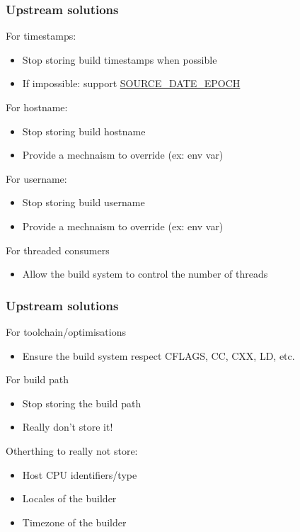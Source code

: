 \begin{frame}
	\frametitle{Upstream solutions}
	For timestamps:
	\begin{itemize}
		\item Stop storing build timestamps when possible
			\pause
		\item If impossible: support \href{https://reproducible-builds.org/specs/source-date-epoch/}{SOURCE\_DATE\_EPOCH}
	\end{itemize}
	\pause
	For hostname:
	\begin{itemize}
		\item Stop storing build hostname
		\pause
		\item Provide a mechnaism to override (ex: env var)
	\end{itemize}
	\pause
	For username:
	\begin{itemize}
		\item Stop storing build username
			\pause
		\item Provide a mechnaism to override (ex: env var)
	\end{itemize}
	\pause
	For threaded consumers
	\begin{itemize}
		\item Allow the build system to control the number of threads
	\end{itemize}
\end{frame}

\begin{frame}
	\frametitle{Upstream solutions}
	For toolchain/optimisations
	\begin{itemize}
		\item Ensure the build system respect CFLAGS, CC, CXX, LD, etc.
	\end{itemize}
	\pause
	For build path
	\begin{itemize}
		\item Stop storing the build path
			\pause
		\item Really don't store it!
	\end{itemize}
	\pause
	Otherthing to really not store:
	\begin{itemize}
		\item Host CPU identifiers/type
			\pause
		\item Locales of the builder
			\pause
		\item Timezone of the builder
	\end{itemize}
\end{frame}

